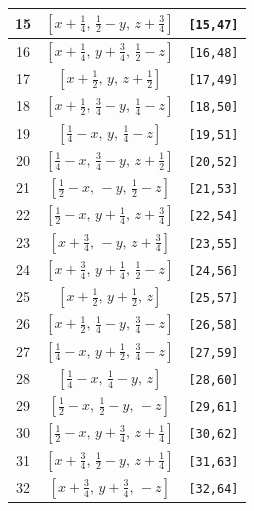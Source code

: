 \documentclass[fleqn,8pt]{jsarticle}
\begin{document}
\begin{longtable}{ccc}
15 & $\left[ x + \frac{1}{4},\, \frac{1}{2} - y,\, z + \frac{3}{4} \right]$ & {\tt [15,47]} \\ \hline
16 & $\left[ x + \frac{1}{4},\, y + \frac{3}{4},\, \frac{1}{2} - z \right]$ & {\tt [16,48]} \\ \hline
17 & $\left[ x + \frac{1}{2},\, y,\, z + \frac{1}{2} \right]$ & {\tt [17,49]} \\ \hline
18 & $\left[ x + \frac{1}{2},\, \frac{3}{4} - y,\, \frac{1}{4} - z \right]$ & {\tt [18,50]} \\ \hline
19 & $\left[ \frac{1}{4} - x,\, y,\, \frac{1}{4} - z \right]$ & {\tt [19,51]} \\ \hline
20 & $\left[ \frac{1}{4} - x,\, \frac{3}{4} - y,\, z + \frac{1}{2} \right]$ & {\tt [20,52]} \\ \hline
21 & $\left[ \frac{1}{2} - x,\, - y,\, \frac{1}{2} - z \right]$ & {\tt [21,53]} \\ \hline
22 & $\left[ \frac{1}{2} - x,\, y + \frac{1}{4},\, z + \frac{3}{4} \right]$ & {\tt [22,54]} \\ \hline
23 & $\left[ x + \frac{3}{4},\, - y,\, z + \frac{3}{4} \right]$ & {\tt [23,55]} \\ \hline
24 & $\left[ x + \frac{3}{4},\, y + \frac{1}{4},\, \frac{1}{2} - z \right]$ & {\tt [24,56]} \\ \hline
25 & $\left[ x + \frac{1}{2},\, y + \frac{1}{2},\, z \right]$ & {\tt [25,57]} \\ \hline
26 & $\left[ x + \frac{1}{2},\, \frac{1}{4} - y,\, \frac{3}{4} - z \right]$ & {\tt [26,58]} \\ \hline
27 & $\left[ \frac{1}{4} - x,\, y + \frac{1}{2},\, \frac{3}{4} - z \right]$ & {\tt [27,59]} \\ \hline
28 & $\left[ \frac{1}{4} - x,\, \frac{1}{4} - y,\, z \right]$ & {\tt [28,60]} \\ \hline
29 & $\left[ \frac{1}{2} - x,\, \frac{1}{2} - y,\, - z \right]$ & {\tt [29,61]} \\ \hline
30 & $\left[ \frac{1}{2} - x,\, y + \frac{3}{4},\, z + \frac{1}{4} \right]$ & {\tt [30,62]} \\ \hline
31 & $\left[ x + \frac{3}{4},\, \frac{1}{2} - y,\, z + \frac{1}{4} \right]$ & {\tt [31,63]} \\ \hline
32 & $\left[ x + \frac{3}{4},\, y + \frac{3}{4},\, - z \right]$ & {\tt [32,64]} \\
\end{longtable}
\end{document}
